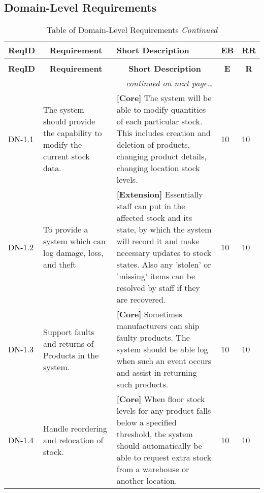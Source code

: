\documentclass[a4paper]{article}
\begin{document}
\subsection{Domain-Level Requirements}

\begin{longtable}{|l|p{5cm}|p{7cm}|p{0.5cm}|p{0.5cm}|}
  \caption{Table of Domain-Level Requirements}\\
  \hline
  \multicolumn{1}{|c|}{\textbf{ReqID}}  &
  \multicolumn{1}{|c|}{\textbf{Requirement}} &
  \textbf{Short Description}&
  \textbf{EB} & 
  \textbf{RR}\\
  \hline\hline
  \endfirsthead
  \caption[]{Table of Domain-Level Requirements \textit{Continued}}\\
  \hline
  \multicolumn{1}{|c|}{\textbf{ReqID}} &
  \multicolumn{1}{|c|}{\textbf{Requirement}} &
  \multicolumn{1}{|c|}{\textbf{Short Description}} & 
  \multicolumn{1}{|c|}{\textbf{E}} & 
  \multicolumn{1}{|c|}{\textbf{R}}\\
  \hline\hline
  \endhead
  \hline
  \multicolumn{3}{r}{\textit{continued on next page\ldots}}\\
  \endfoot
  \hline
  \endlastfoot
  \textcolor{black}{DN-1.1} & The system should provide the capability to modify the current stock data. & \textbf{[Core] }The system will be able to modify quantities of each particular stock. This includes creation and deletion of products, changing product details, changing location stock levels.& 10 & 10\\
  \textcolor{black}{DN-1.2} &  To provide a system which can log damage, loss, and theft & \textbf{[Extension] }Essentially staff can put in the affected stock and its state, by which the system will record it and make necessary updates to stock states. Also any ’stolen’ or ’missing’ items can be resolved by staff if they are recovered.  & 10 & 10\\
  \textcolor{black}{DN-1.3} & Support faults and returns of Products in the system.  & \textbf{[Core] }Sometimes manufacturers can ship faulty products. The system should be able log when such an event occurs and assist in returning such products.& 10 & 10\\
  \textcolor{black}{DN-1.4} & Handle reordering and relocation of stock. & \textbf{[Core] }When floor stock levels for any product falls below a specified threshold, the system should automatically be able to request extra stock from a warehouse or another location.& 10 & 10\\

\end{longtable}
\end{document}
